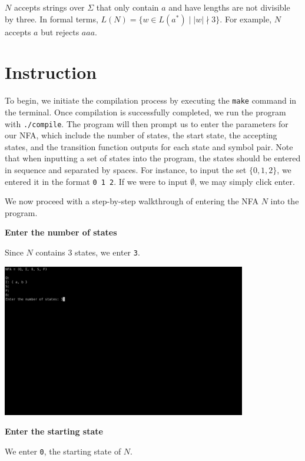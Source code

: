 \documentclass{article}
\begin{document}
$N$ accepts strings over $\Sigma$ that only contain $a$ and have lengths are not divisible by three.
In formal terms, $L(N) = \{w \in L(a^*) \mid |w| \nmid 3\}$. For example, $N$ accepts $a$ but
rejects $aaa$.

\section*{Instruction}


To begin, we initiate the compilation process by executing the \verb|make| command in the terminal.
Once compilation is successfully completed, we run the program with \verb|./compile|. The program
will then prompt us to enter the parameters for our NFA, which include the number of states, the
start state, the accepting states, and the transition function outputs for each state and symbol
pair. Note that when inputting a set of states into the program, the states should be entered in
sequence and separated by spaces. For instance, to input the set $\{0, 1, 2\}$, we entered it in the
format \verb|0 1 2|. If we were to input $\emptyset$, we may simply click enter.

We now proceed with a step-by-step walkthrough of entering the NFA $N$ into the program. 

\newpage

\textbf{\large Enter the number of states}

Since $N$ contains $3$ states, we enter \verb|3|.

\begin{center}
  \includegraphics[width=0.8\textwidth]{num}
\end{center}


\textbf{\large Enter the starting state}

We enter \verb|0|, the starting state of $N$.
\end{document}
